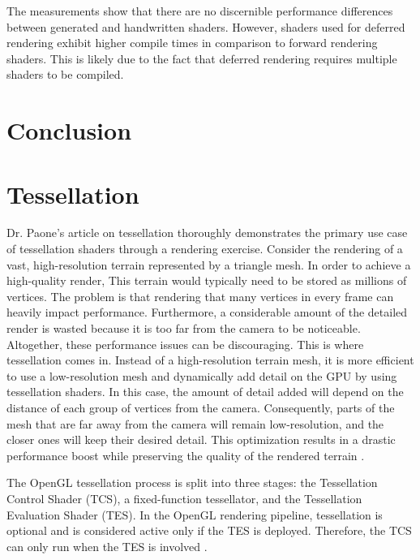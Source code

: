 \documentclass[
  digital,     %
  oneside,     %
  nosansbold,  %
  nocolorbold, %
  lof,         %
  lot,         %
]{fithesis4}
\begin{document}
The measurements show that there are no discernible performance differences between
generated and handwritten shaders. However, shaders used for deferred rendering
exhibit higher compile times in comparison to forward rendering shaders.
This is likely due to the fact that deferred rendering requires multiple shaders to be compiled.


\chapter*{Conclusion}

\appendix %
\chapter{Tessellation}\label{app:tessellation}
Dr. Paone's article on tessellation \cite{openglwiki-tessellation} thoroughly demonstrates the primary use case of tessellation
shaders through a rendering exercise. Consider the rendering of a vast,
high-resolution terrain represented by a triangle mesh. In order to achieve a high-quality render,
This terrain would typically need to be stored as millions of vertices.
The problem is that rendering that many vertices in every frame can heavily impact performance. Furthermore, a
considerable amount of the detailed render is wasted because it is too far from the camera to be
noticeable. Altogether, these performance issues can be discouraging.
This is where tessellation comes in. Instead of a high-resolution terrain mesh, it is more
efficient to use a low-resolution mesh and dynamically add detail on the GPU by using tessellation
shaders. In this case, the amount of detail added will depend on the distance of each group of
vertices from the camera. Consequently, parts of the mesh that are far away from the camera will
remain low-resolution, and the closer ones will keep their desired detail. This optimization results in
a drastic performance boost while preserving the quality of the rendered terrain \cite{learnopengl-tessellation}.

The OpenGL tessellation process is split into three stages: the Tessellation Control Shader (TCS), a
fixed-function tessellator, and the Tessellation Evaluation Shader (TES). In the OpenGL rendering
pipeline, tessellation is optional and is considered active only if the TES is
deployed. Therefore, the TCS can only run when the TES is involved \cite{openglwiki-tessellation}.
\end{document}
